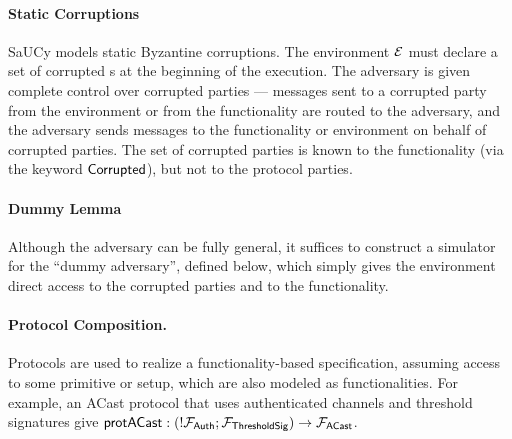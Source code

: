 \paragraph{Static Corruptions}
SaUCy models static Byzantine corruptions. The environment ${\mathcal {E}}$ must declare a set of corrupted s at the beginning of the execution. The adversary is given complete control over corrupted parties --- messages sent to a corrupted party from the environment or from the functionality are routed to the adversary, and the adversary sends messages to the functionality or environment on behalf of corrupted parties. The set of corrupted parties is known to the functionality (via the keyword ${\mathsf {Corrupted}}$), but not to the protocol parties.

\paragraph{Dummy Lemma}
Although the adversary can be fully general, it suffices to construct a simulator for the ``dummy adversary'', defined below, which simply gives the environment direct access to the corrupted parties and to the functionality.

\paragraph{Protocol Composition.}
Protocols are used to realize a functionality-based specification, assuming access to some primitive or setup, which are also modeled as functionalities. For example, an ACast protocol that uses authenticated channels and threshold signatures give $\msf{protACast} : (!\F{Auth}; \F{ThresholdSig}) \rightarrow \F{ACast}$.


